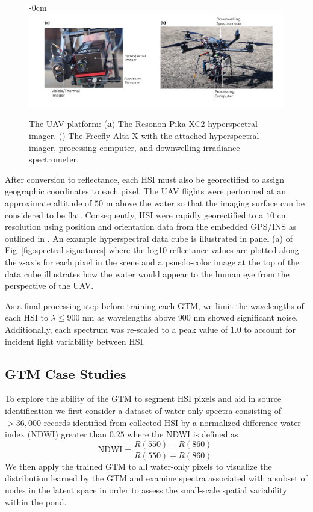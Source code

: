 \documentclass[remotesensing,article,submit,pdftex,moreauthors]{Definitions/mdpi}
\begin{document}
\begin{figure}[t]
\begin{adjustwidth}{-\extralength}{0cm}
\centering
\includegraphics[width=15.5cm]{paper/figures/methods/annotated-drone.pdf}
\end{adjustwidth}
\caption{The UAV platform: (\textbf{a}) The Resonon Pika XC2 hyperspectral imager. () The Freefly Alta-X with the attached hyperspectral imager, processing computer, and downwelling irradiance spectrometer. \label{fig:drone}}
\end{figure}  




After conversion to reflectance, each HSI must also be georectified to assign geographic coordinates to each pixel. The UAV flights were performed at an approximate altitude of $50$ m above the water so that the imaging surface can be considered to be flat. Consequently, HSI were rapidly georectified to a $10$ cm resolution using position and orientation data from the embedded GPS/INS as outlined in \cite{muller2002program, baumker2001new, mostafa2000multi}. An example hyperspectral data cube is illustrated in panel (a) of Fig~\ref{fig:spectral-signatures} where the log10-reflectance values are plotted along the z-axis for each pixel in the scene and a psuedo-color image at the top of the data cube illustrates how the water would appear to the human eye from the perspective of the UAV.

As a final processing step before training each GTM, we limit the wavelengths of each HSI to $\lambda \leq 900$ nm as wavelengths above $900$ nm showed significant noise. Additionally, each spectrum was re-scaled to a peak value of $1.0$ to account for incident light variability between HSI.

\subsection{GTM Case Studies}\label{sec:case-studies}

To explore the ability of the GTM to segment HSI pixels and aid in source identification we first consider a dataset of water-only spectra consisting of $>36,000$ records identified from collected HSI by a normalized difference water index (NDWI) greater than $0.25$ where the NDWI is defined as 
\begin{equation}
    \text{NDWI} = \dfrac{R(550) - R(860)}{R(550) + R(860)}.
\end{equation}
We then apply the trained GTM to all water-only pixels to visualize the distribution learned by the GTM and examine spectra associated with a subset of nodes in the latent space in order to assess the small-scale spatial variability within the pond.
\end{document}
